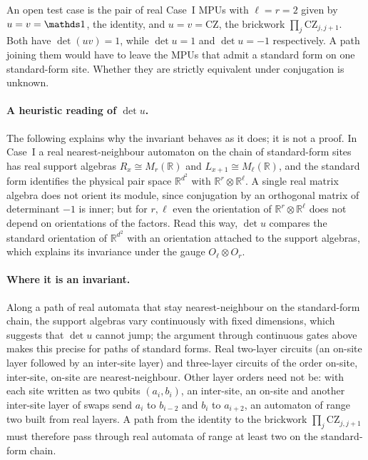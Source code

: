 \documentclass{article}
\begin{document}
An open test case is the pair of real Case~I MPUs with $\ell=r=2$ given by
$u=v=\Id$, the identity, and $u=v=\mathrm{CZ}$, the brickwork
$\prod_j\mathrm{CZ}_{j,j+1}$. Both have $\det(uv)=1$, while $\det u=1$ and
$\det u=-1$ respectively. A path joining them would have to leave the MPUs that
admit a standard form on one standard-form site. Whether they are strictly
equivalent under conjugation is unknown.

\paragraph{A heuristic reading of $\det u$.} The following explains why the
invariant behaves as it does; it is not a proof. In Case~I a real
nearest-neighbour automaton on the chain of standard-form sites has real
support algebras $R_x\cong M_r(\mathbb R)$ and $L_{x+1}\cong M_\ell(\mathbb R)$,
and the standard form identifies the physical pair space $\mathbb R^{d^2}$ with
$\mathbb R^r\otimes\mathbb R^\ell$. A single real matrix algebra does not orient
its module, since conjugation by an orthogonal matrix of determinant $-1$ is
inner; but for $r,\ell$ even the orientation of $\mathbb R^r\otimes\mathbb R^\ell$
does not depend on orientations of the factors. Read this way, $\det u$
compares the standard orientation of $\mathbb R^{d^2}$ with an orientation
attached to the support algebras, which explains its invariance under the gauge
$O_\ell\otimes O_r$.

\paragraph{Where it is an invariant.} Along a path of real automata that stay
nearest-neighbour on the standard-form chain, the support algebras vary
continuously with fixed dimensions, which suggests that $\det u$ cannot jump;
the argument through continuous gates above makes this precise for paths of
standard forms. Real two-layer circuits (an on-site layer followed by an
inter-site layer) and three-layer circuits of the order on-site, inter-site,
on-site are nearest-neighbour. Other layer orders need not be: with each site
written as two qubits $(a_i,b_i)$, an inter-site, an on-site and another
inter-site layer of swaps send $a_i$ to $b_{i-2}$ and $b_i$ to $a_{i+2}$, an
automaton of range two built from real layers. A path from the identity to the
brickwork $\prod_j\mathrm{CZ}_{j,j+1}$ must therefore pass through real automata
of range at least two on the standard-form chain.
\end{document}
